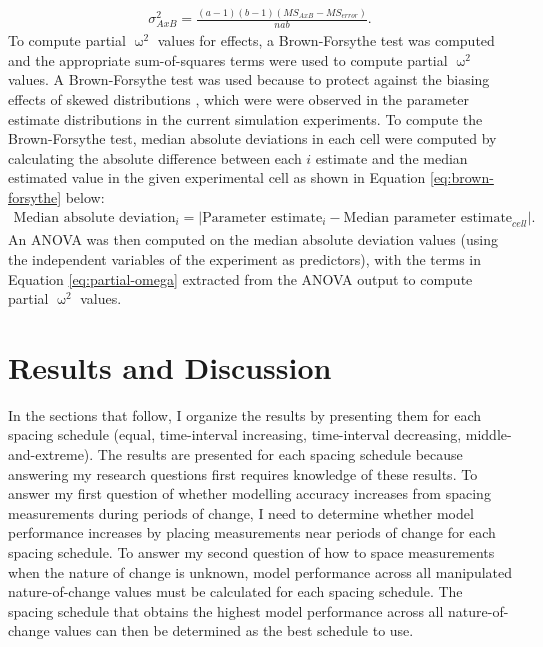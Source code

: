 \documentclass[
12pt, %
twoside,
english]{guelphthesis}
\begin{document}
\begin{align}
 \sigma^2_{A x B} = \frac{(a - 1)(b-1)(MS_{AxB} - MS_{error})}{nab}. 
\label{eq:var-interac}
\end{align}
To compute partial \(\upomega^2\) values for effects, a Brown-Forsythe test was computed and the appropriate
sum-of-squares terms were used to compute partial \(\upomega^2\) values. A Brown-Forsythe test was used because to protect against the biasing effects of skewed distributions \autocite{brown1974}, which were were observed in the parameter estimate distributions in the current simulation experiments. To compute the Brown-Forsythe test, median absolute deviations in each cell were computed by calculating the absolute difference between each \(i\) estimate and the median estimated value in the given experimental cell as shown in Equation \ref{eq:brown-forsythe} below:
\begin{align}
\text{Median absolute deviation}_i = \lvert \text{Parameter estimate}_i - \text{Median parameter estimate}_{cell} \rvert.
\label{eq:brown-forsythe}
\end{align}
\noindent An ANOVA was then computed on the median absolute deviation values (using the independent variables of the experiment as predictors), with the terms in Equation \ref{eq:partial-omega} extracted from the ANOVA output to compute partial \(\upomega^2\) values.

\hypertarget{results-and-discussion}{%
\section{Results and Discussion}\label{results-and-discussion}}

In the sections that follow, I organize the results by presenting them for each spacing schedule (equal, time-interval
increasing, time-interval decreasing, middle-and-extreme). The results are presented for each spacing schedule because
answering my research questions first requires knowledge of these results. To answer my first question of whether modelling
accuracy increases from spacing measurements during periods of change, I need to determine whether model performance
increases by placing measurements near periods of change for each spacing schedule. To answer my second question of how to
space measurements when the nature of change is unknown, model performance across all manipulated nature-of-change values
must be calculated for each spacing schedule. The spacing schedule that obtains the highest model performance across all
nature-of-change values can then be determined as the best schedule to use.
\end{document}
